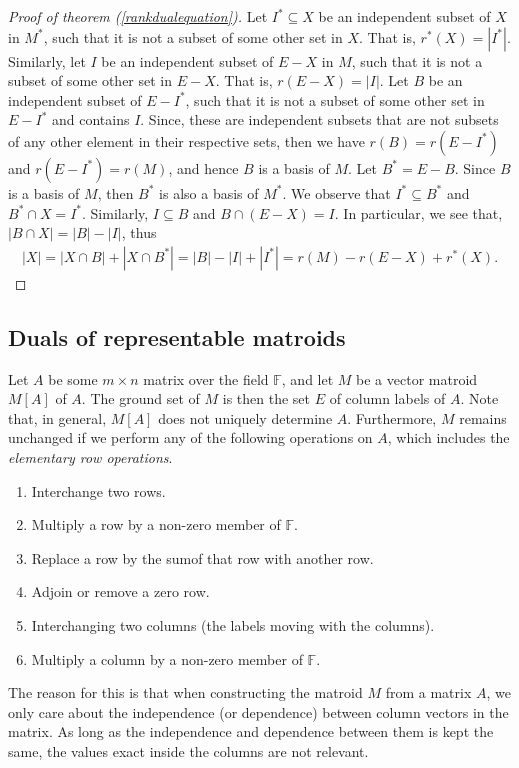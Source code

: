 \begin{proof}[Proof of theorem (\ref{rankdualequation})]
    Let $I^* \subseteq X$ be an independent subset of $X$ in $M^*$, such that it is not a subset of some other set in $X$. That is, $r^*(X)=|I^*|$. Similarly, let $I$ be an independent subset of $E-X$ in $M$, such that it is not a subset of some other set in $E-X$. That is, $r(E-X)=|I|$. Let $B$ be an independent subset of $E-I^*$, such that it is not a subset of some other set in $E-I^*$ and contains $I$. Since, these are independent subsets that are not subsets of any other element in their respective sets, then we have $r(B)=r(E-I^*)$ and $r(E-I^*)=r(M)$, and hence $B$ is a basis of $M$.
    Let $B^*=E-B$. Since $B$ is a basis of $M$, then $B ^* $ is also a basis of $M^*$. We observe that $I^*\subseteq B^*$ and  $B^*\cap X=I^*$. Similarly, $I\subseteq B$ and  $B\cap (E-X)=I$. In particular, we see that, $|B\cap X|=|B|-|I|$, thus
    \begin{align*}
    |X|=|X\cap B|+|X\cap B^*|=|B|-|I|+|I^*|=r(M)-r(E-X)+r^*(X).
    \end{align*}
\end{proof}

\newpage
\subsection{Duals of representable matroids}

Let $A$ be some $m \times n$ matrix over the field $\mathbb{F}$, and let $M$ be a vector matroid $M[A]$ of $A$. The ground set of $M$ is then the set $E$ of column labels of $A$. Note that, in general, $M[A]$ does not uniquely determine $A$. Furthermore, $M$ remains unchanged if we perform any of the following operations on $A$, which includes the \textit{elementary row operations}.
\begin{enumerate}
    \item Interchange two rows.
    \item Multiply a row by a non-zero member of $\mathbb{F}$.
    \item Replace a row by the sumof that row with another row.
    \item Adjoin or remove a zero row.
    \item Interchanging two columns (the labels moving with the columns).
    \item Multiply a column by a non-zero member of $\mathbb{F}$.
\end{enumerate}

The reason for this is that when constructing the matroid $M$ from a matrix $A$, we only care about the independence (or dependence) between column vectors in the matrix. As long as the independence and dependence between them is kept the same, the values exact inside the columns are not relevant.

